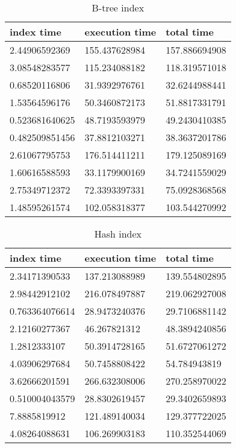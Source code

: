 \begin{itemize*}
\begin{table}[H]
\begin{center}
\begin{tabular}{|l|l|l|}
\hline
index time & execution time & total time                \\ \hline
2.44906592369 & 155.437628984 & 157.886694908 \\ \hline
3.08548283577 & 115.234088182 & 118.319571018 \\ \hline
0.68520116806 & 31.9392976761 & 32.6244988441 \\ \hline
1.53564596176 & 50.3460872173 & 51.8817331791 \\ \hline
0.523681640625 & 48.7193593979 & 49.2430410385 \\ \hline
0.482509851456 & 37.8812103271 & 38.3637201786 \\ \hline
2.61067795753 & 176.514411211 & 179.125089169 \\ \hline
1.60616588593 & 33.1179900169 & 34.7241559029 \\ \hline
2.75349712372 & 72.3393397331 & 75.0928368568 \\ \hline
1.48595261574 & 102.058318377 & 103.544270992 \\ \hline
\end{tabular}
\end{center}
\caption{B-tree index}
\end{table}

\begin{table}[H]
\begin{center}
\begin{tabular}{|l|l|l|}
\hline
index time & execution time & total time     \\ \hline
2.34171390533 & 137.213088989 & 139.554802895 \\ \hline
2.98442912102 & 216.078497887 & 219.062927008 \\ \hline
0.763364076614 & 28.9473240376 & 29.7106881142 \\ \hline
2.12160277367 & 46.267821312 & 48.3894240856 \\ \hline
1.2812333107 & 50.3914728165 & 51.6727061272 \\ \hline
4.03906297684 & 50.7458808422 & 54.784943819 \\ \hline
3.62666201591 & 266.632308006 & 270.258970022 \\ \hline
0.510004043579 & 28.8302619457 & 29.3402659893 \\ \hline
7.8885819912 & 121.489140034 & 129.377722025 \\ \hline
4.08264088631 & 106.269903183 & 110.352544069 \\ \hline
\end{tabular}
\end{center}
\caption{Hash index}
\end{table}


\end{itemize*}
